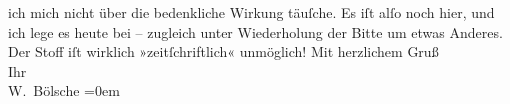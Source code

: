 \begin{ledgroupsized}[t]{13cm}
                    ich mich nicht über die bedenkliche Wirkung täuſche. Es iſt alſo noch hier, und
                    ich lege es heute bei – zugleich unter Wiederholung der Bitte um etwas Anderes.
                    Der Stoff iſt wirklich
                    »zeitſchriftlich« unmöglich!\pend
           \pstart
           Mit herzlichem Gruß{\\[\baselineskip]}Ihr{\\[\baselineskip]}\spacefill\mbox{W. Bölsche}\pend
           \leftskip=0em{}
         
         \endnumbering{}\end{ledgroupsized}  \newcommand{\dateiname}{L00106}\newcommand{\titel}{Wilhelm Bölsche an Arthur Schnitzler, [24. 7. 1892]}\newcommand{\editorInnen}{Martin Anton Müller und Gerd-Hermann Susen}
      